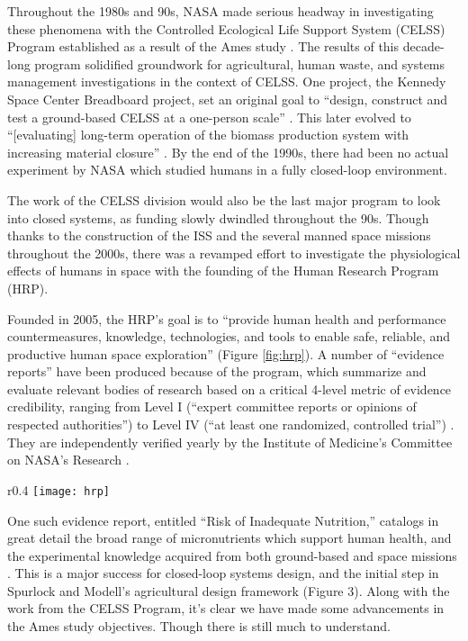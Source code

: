 Throughout the 1980s and 90s, NASA made serious headway in investigating these phenomena with the Controlled Ecological Life Support System (CELSS) Program established as a result of the Ames study \cite{CELSS_1989,CELSS_1979}. The results of this decade-long program solidified groundwork for agricultural, human waste, and systems management investigations in the context of CELSS. One project, the Kennedy Space Center Breadboard project, set an original goal to “design, construct and test a ground-based CELSS at a one-person scale” \cite{breadboard}. This later evolved to “[evaluating] long-term operation of the biomass production system with increasing material closure” \cite{breadboard_waste}. By the end of the 1990s, there had been no actual experiment by NASA which studied humans in a fully closed-loop environment.

The work of the CELSS division would also be the last major program to look into closed systems, as funding slowly dwindled throughout the 90s. Though thanks to the construction of the ISS and the several manned space missions throughout the 2000s, there was a revamped effort to investigate the physiological effects of humans in space with the founding of the Human Research Program (HRP).

Founded in 2005, the HRP’s goal is to “provide human health and performance countermeasures, knowledge, technologies, and tools to enable safe, reliable, and productive human space exploration” \cite{HRP_intro} (Figure \ref{fig:hrp}). A number of “evidence reports” have been produced because of the program, which summarize and evaluate relevant bodies of research based on a critical 4-level metric of evidence credibility, ranging from Level I (“expert committee reports or opinions of respected authorities”) to Level IV (“at least one randomized, controlled trial”) \cite{HRP_intro}. They are independently verified yearly by the Institute of Medicine’s Committee on NASA's Research \cite{HRP_review}. 

\begin{wrapfigure}{r}{0.4\textwidth}
    \centering
    \texttt{[image: hrp]}
    \caption{Human Research Program}
    \label{fig:hrp}
\end{wrapfigure}

One such evidence report, entitled “Risk of Inadequate Nutrition,” catalogs in great detail the broad range of micronutrients which support human health, and the experimental knowledge acquired from both ground-based and space missions \cite{HRP_nutrition}. This is a major success for closed-loop systems design, and the initial step in Spurlock and Modell’s agricultural design framework (Figure 3). Along with the work from the CELSS Program, it’s clear we have made some advancements in the Ames study objectives. Though there is still much to understand.

